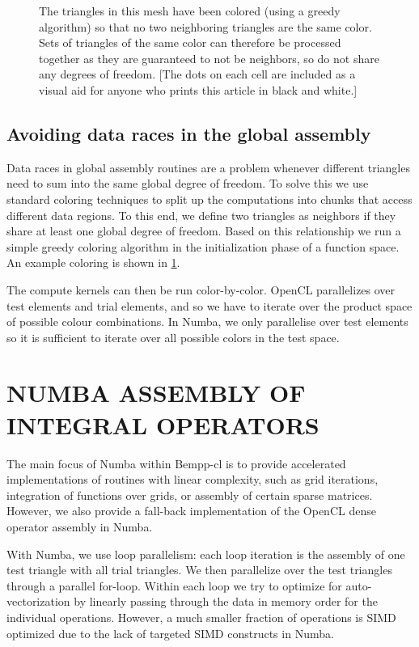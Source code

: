 \documentclass{IEEEcsmag}
\begin{document}
\begin{figure}
	\center
	
	\caption{The triangles in this mesh have been colored (using a greedy algorithm) so that no two neighboring triangles are the same color. Sets of triangles of the same color can therefore be processed together as they are guaranteed to not be neighbors, so do not share any degrees of freedom. [The dots on each cell are included as a visual aid for anyone who prints this article in black and white.]}
	\label{fig:colouring}
\end{figure}

\subsection{Avoiding data races in the global assembly}
Data races in global assembly routines are a problem whenever different triangles need to sum into the same global degree of freedom. To solve this we use standard coloring techniques to split up the computations into chunks that access different data regions. To this end, we define two triangles as neighbors if they share at least one global degree of freedom. Based on this relationship we run a simple greedy coloring algorithm in the initialization phase of a function space. An example coloring is shown in \cref{fig:colouring}.

The compute kernels can then be run color-by-color. OpenCL parallelizes over test elements and trial elements, and so we have to iterate over the product space of possible colour combinations. In Numba, we only parallelise over test elements so it is sufficient to iterate over all possible colors in the test space.


\section{NUMBA ASSEMBLY OF INTEGRAL OPERATORS}
The main focus of Numba \cite{numba} within Bempp-cl is to provide accelerated implementations of routines with linear complexity, such as grid iterations, integration of functions over grids, or assembly of certain sparse matrices. However, we also provide a fall-back implementation of the OpenCL dense operator assembly in Numba.

With Numba, we use loop parallelism: each loop iteration is the assembly of one test triangle with all trial triangles. We then parallelize over the test triangles through a parallel for-loop.
Within each loop we try to optimize for auto-vectorization by linearly passing through the data in memory order for the individual operations. However, a much smaller fraction of operations is SIMD optimized due to the lack of targeted SIMD constructs in Numba.
\end{document}
